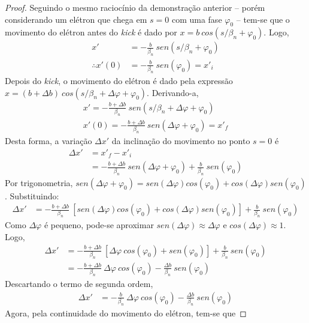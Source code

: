 \begin{proof}
	Seguindo o mesmo raciocínio da demonstração anterior -- porém considerando um elétron que chega em $s=0$ com uma fase $\varphi_0$ -- tem-se que o movimento do elétron antes do \textit{kick} é dado por $x = b\ cos(s/\beta_n + \varphi_0)$. Logo,
	\begin{align*}
		x' &= -\frac{b}{\beta_n}\ sen(s/\beta_n + \varphi_0)\\
		\therefore x'(0) &= -\frac{b}{\beta_n}\ sen(\varphi_0) = x'_i
	\end{align*}
	Depois do \textit{kick}, o movimento do elétron é dado pela expressão $x = (b+\Delta b)\ cos(s/\beta_n + \Delta \varphi + \varphi_0)$. Derivando-a,
	\begin{align*}
		x' = -\frac{b+\Delta b}{\beta_n}\ sen(s/\beta_n + \Delta \varphi + \varphi_0)\\
		x'(0) = -\frac{b+\Delta b}{\beta_n}\ sen(\Delta \varphi + \varphi_0) = x'_f
	\end{align*}
	Desta forma, a variação $\Delta x'$ da inclinação do movimento no ponto $s=0$ é
	\begin{align*}
		\Delta x' &= x'_f - x'_i\\
				  &= -\frac{b+\Delta b}{\beta_n}\ sen(\Delta \varphi + \varphi_0) + \frac{b}{\beta_n}\ sen(\varphi_0)
	\end{align*}
	Por trigonometria, $sen(\Delta \varphi + \varphi_0) = sen(\Delta \varphi)cos(\varphi_0) + cos(\Delta \varphi)sen(\varphi_0)$. Substituindo:
	\begin{align*}
		\Delta x' &= -\frac{b+\Delta b}{\beta_n}\ [sen(\Delta \varphi)cos(\varphi_0) + cos(\Delta \varphi)sen(\varphi_0)] + \frac{b}{\beta_n}\ sen(\varphi_0)
	\end{align*}
	Como $\Delta \varphi$ é pequeno, pode-se aproximar $sen(\Delta \varphi) \approx \Delta \varphi$ e $cos(\Delta \varphi) \approx 1$. Logo,
	\begin{align*}
		\Delta x' &= -\frac{b+\Delta b}{\beta_n}\ [\Delta \varphi\ cos(\varphi_0) + sen(\varphi_0)] + \frac{b}{\beta_n}\ sen(\varphi_0)\\
				  &= -\frac{b+\Delta b}{\beta_n}\ \Delta \varphi\ cos(\varphi_0) - \frac{\Delta b}{\beta_n}\ sen(\varphi_0)
	\end{align*}
	Descartando o termo de segunda ordem,
	\begin{align*}
		\Delta x' &= -\frac{b}{\beta_n}\ \Delta \varphi\ cos(\varphi_0) - \frac{\Delta b}{\beta_n}\ sen(\varphi_0)
	\end{align*}
	Agora, pela continuidade do movimento do elétron, tem-se que

\end{proof}
